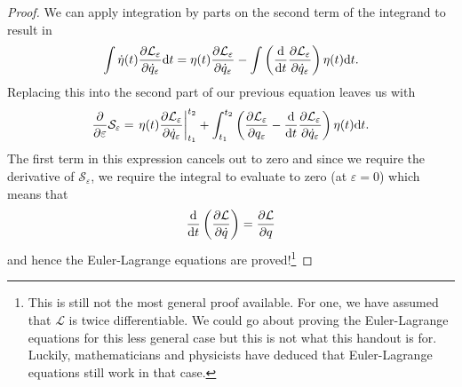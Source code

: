 \documentclass[11pt]{scrartcl}
\begin{document}
\begin{proof}
We can apply integration by parts on the second term of the integrand to result in 
\[\int \dot\eta (t) \pdv{\mathcal{L}_{\varepsilon}}{\dot{q}_{\varepsilon}} \dd t = \eta (t) \pdv{\mathcal{L}_{\varepsilon}}{\dot{q}_{\varepsilon}} - \int \left(\dv{}{t} \pdv{\mathcal{L}_{\varepsilon}}{\dot{q}_{\varepsilon}}\right)\eta (t) \dd t.\]
Replacing this into the second part of our previous equation leaves us with 
\[\pdv{}{\varepsilon} \mathcal{S}_{\varepsilon} = \left.\eta (t) \pdv{\mathcal{L}_{\varepsilon}}{\dot{q}_{\varepsilon}}\right|_{t_1}^{t_2} + \int_{t_1}^{t_2}\left(\pdv{\mathcal{L}_{\varepsilon}}{q_{\varepsilon}} - \dv{}{t}\pdv{\mathcal{L}_{\varepsilon}}{\dot{q}_{\varepsilon}}\right)\eta (t) \dd t.\]
The first term in this expression cancels out to zero and since we require the derivative of $\mathcal{S}_{\varepsilon}$, we require the integral to evaluate to zero (at $\varepsilon = 0$) which means that 
\[\dv{}{t}\left(\pdv{\mathcal{L}}{\dot{q}}\right) = \pdv{\mathcal{L}}{{q}}\]
and hence the Euler-Lagrange equations are proved!\footnote{This is still not the most general proof available. For one, we have assumed that $\mathcal{L}$ is twice differentiable. We could go about proving the Euler-Lagrange equations for this less general case but this is not what this handout is for. Luckily, mathematicians and physicists have deduced that Euler-Lagrange equations still work in that case.}
\end{proof}
\end{document}
